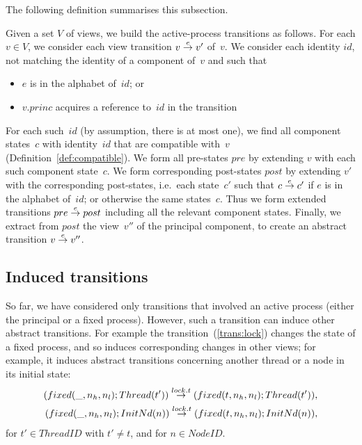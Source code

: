 

The following definition summarises this subsection.
%
\begin{definition}
\label{def:active-process-transition}
Given a set $V$ of views, we build the active-process transitions as follows.
For each $v \in V$, we consider each view transition $v \stackrel{e}\rightarrow v'$ of~$v$.
We consider each identity $id$, not matching the identity of a component
of~$v$ and such that
%
\begin{itemize}
\item $e$ is in the alphabet of~$id$; or

\item $v.princ$ acquires a reference to~$id$ in the transition
\end{itemize}
%
For each such~$id$ (by assumption, there is at most one), we find all
component states~$c$ with identity~$id$ that are compatible with~$v$
(Definition~\ref{def:compatible}).  We form all pre-states $pre$ by extending
$v$ with each such component state~$c$.  We form corresponding post-states
$post$ by extending $v'$ with the corresponding post-states, i.e.\ each
state~$c'$ such that $c \stackrel{e}\rightarrow c'$ if $e$ is in the alphabet of~$id$; or
otherwise the same states~$c$.  Thus we form extended transitions $pre
\stackrel{e}\rightarrow post$ including all the relevant component states.  Finally, we
extract from $post$ the view~$v''$ of the principal component, to create an
abstract transition $v \stackrel{e}\rightarrow v''$.
\end{definition}


\subsection{Induced transitions}

So far, we have considered only transitions that involved an active process
(either the principal or a fixed process). However, such a transition can
induce other abstract transitions.  For example the
transition~(\ref{trans:lock}) changes the state of a fixed process, and so
induces corresponding changes in other views; for example, it induces abstract
transitions concerning another thread or a node in its initial state:
%
\[
\begin{align}
(fixed(\_, n_h, n_l); Thread(t'))  \stackrel{lock.t}\rightarrow 
  (fixed(t, n_h, n_l); Thread(t')), \\
(fixed(\_, n_h, n_l); InitNd(n))  \stackrel{lock.t}\rightarrow 
  (fixed(t, n_h, n_l); InitNd(n)),
\end{align}
\]
%
for $t' \in ThreadID$ with $t' \ne t$, and for $n \in NodeID$.

